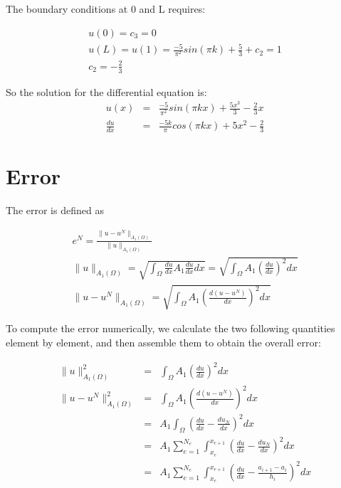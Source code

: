 \documentclass[paper=a4, fontsize=11pt]{article} %
\begin{document}
The boundary conditions at 0 and L requires:

\begin{eqnarray}
u(0) = c_3 = 0\nonumber\\
u(L) = u(1) =\frac{-5}{\pi ^2}sin(\pi k) + \frac{5}{3} + c_2=1\nonumber\\
c_2= -\frac{2}{3}
\end{eqnarray}

So the solution for the differential equation is:
\begin{eqnarray}
u(x)&=&\frac{-5}{\pi ^2}sin(\pi kx) + \frac{5x^3}{3}  -\frac{2}{3}x \nonumber\\
\frac{du}{dx}&=& \frac{-5k}{\pi} cos(\pi kx) + 5x^2 - \frac{2}{3}
\end{eqnarray}

\section{Error}
The error is defined as 

\begin{eqnarray}
e^N = \frac{\| u -u^N \| _{A_1(\Omega)}} {\| u \| _{A_1 (\Omega)}} \nonumber\\
\| u \| _{A_1 (\Omega)} = \sqrt{\int_{\Omega} \frac{du}{dx} A_1 \frac{du}{dx} dx} = \sqrt{\int_{\Omega} A_1(\frac{du}{dx})^2 dx}\nonumber\\
\| u -u^N \| _{A_1(\Omega)} = \sqrt{\int_{\Omega} A_1 (\frac{d(u-u^N)}{dx})^2 dx}
\end{eqnarray}

To compute the error numerically, we calculate the two following quantities element by element, and then assemble them to obtain the overall error:

\begin{eqnarray}
\| u \| _{A_1 (\Omega)}^2 &=&\int_{\Omega} A_1(\frac{du}{dx})^2 dx\nonumber\\
\| u -u^N \| _{A_1(\Omega)} ^2 &=& \int_{\Omega} A_1 (\frac{d(u-u^N)}{dx})^2 dx\nonumber\\
&=& A_1 \int_{\Omega} (\frac{du}{dx} - \frac{du_N}{dx})^2 dx\nonumber\\
&=& A_1 \sum_{e=1}^{N_e} \int_{x_e}^{x_{e+1}} (\frac{du}{dx} - \frac{du_N}{dx})^2 dx \nonumber\\
&=& A_1 \sum_{e=1}^{N_e} \int_{x_e}^{x_{e+1}} (\frac{du}{dx} - \frac{a_{i+1}-a_i}{h_i})^2 dx
\end{eqnarray}
\end{document}

